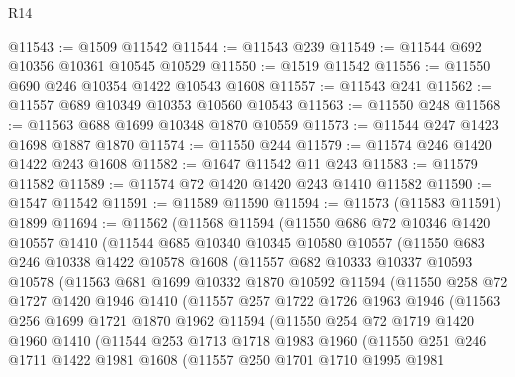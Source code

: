 \begin{lexlean}{R14}
\begin{coremodule}
@11543 := @1509 @11542
@11544 := @11543 @239
@11549 := @11544 @692 @10356 @10361 @10545 @10529
@11550 := @1519 @11542
@11556 := @11550 @690 @246 @10354 @1422 @10543 @1608
@11557 := @11543 @241
@11562 := @11557 @689 @10349 @10353 @10560 @10543
@11563 := @11550 @248
@11568 := @11563 @688 @1699 @10348 @1870 @10559
@11573 := @11544 @247 @1423 @1698 @1887 @1870
@11574 := @11550 @244
@11579 := @11574 @246 @1420 @1422 @243 @1608
@11582 := @1647 @11542 @11 @243
@11583 := @11579 @11582
@11589 := @11574 @72 @1420 @1420 @243 @1410 @11582
@11590 := @1547 @11542
@11591 := @11589 @11590
@11594 := @11573 (@11583 @11591) @1899
@11694 := @11562
    (@11568
      @11594
      (@11550
        @686
        @72
        @10346
        @1420
        @10557
        @1410
        (@11544
          @685
          @10340
          @10345
          @10580
          @10557
          (@11550
            @683
            @246
            @10338
            @1422
            @10578
            @1608
            (@11557
              @682
              @10333
              @10337
              @10593
              @10578
              (@11563
                @681
                @1699
                @10332
                @1870
                @10592
                @11594
                (@11550
                  @258
                  @72
                  @1727
                  @1420
                  @1946
                  @1410
                  (@11557
                    @257
                    @1722
                    @1726
                    @1963
                    @1946
                    (@11563
                      @256
                      @1699
                      @1721
                      @1870
                      @1962
                      @11594
                      (@11550
                        @254
                        @72
                        @1719
                        @1420
                        @1960
                        @1410
                        (@11544
                          @253
                          @1713
                          @1718
                          @1983
                          @1960
                          (@11550
                            @251
                            @246
                            @1711
                            @1422
                            @1981
                            @1608
                            (@11557
                              @250
                              @1701
                              @1710
                              @1995
                              @1981

\end{coremodule}
\end{lexlean}

